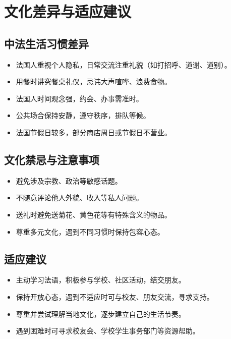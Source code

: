 \section{文化差异与适应建议}

\subsection{中法生活习惯差异}
\begin{itemize}
    \item 法国人重视个人隐私，日常交流注重礼貌（如打招呼、道谢、道别）。
    \item 用餐时讲究餐桌礼仪，忌讳大声喧哗、浪费食物。
    \item 法国人时间观念强，约会、办事需准时。
    \item 公共场合保持安静，遵守秩序，排队等候。
    \item 法国节假日较多，部分商店周日或节假日不营业。
\end{itemize}

\subsection{文化禁忌与注意事项}
\begin{itemize}
    \item 避免涉及宗教、政治等敏感话题。
    \item 不随意评论他人外貌、收入等私人问题。
    \item 送礼时避免送菊花、黄色花等有特殊含义的物品。
    \item 尊重多元文化，遇到不同习惯时保持包容心态。
\end{itemize}

\subsection{适应建议}
\begin{itemize}
    \item 主动学习法语，积极参与学校、社区活动，结交朋友。
    \item 保持开放心态，遇到不适应时可与校友、朋友交流，寻求支持。
    \item 尊重并尝试理解当地文化，逐步建立自己的生活节奏。
    \item 遇到困难时可寻求校友会、学校学生事务部门等资源帮助。
\end{itemize}
